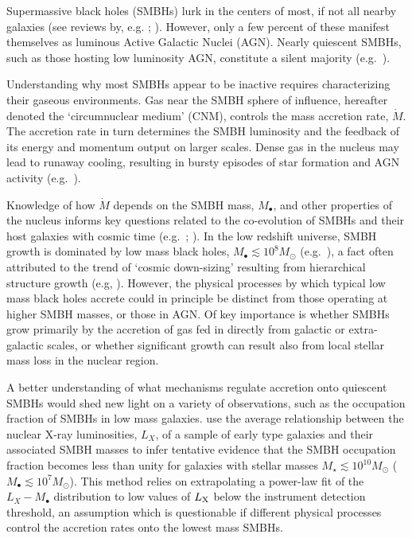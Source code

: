 \documentclass[usenatbib,fleqn]{mn2e}
\newcommand{\Mbh}[1][]{M_{\bullet#1}}
\begin{document}
Supermassive black holes (SMBHs) lurk in the centers of most, if not
all nearby galaxies (see reviews by,
e.g. \citealt{KormendyRichstone:1995a};
\citealt{FerrareseFord:2005a}). However, only a few percent of these
manifest themselves as luminous Active Galactic Nuclei (AGN).  Nearly
quiescent SMBHs, such as those hosting low luminosity AGN, constitute
a silent majority (e.g.~\citealt{Ho:2009a}).

Understanding why most SMBHs appear to be inactive requires
characterizing their gaseous environments.  Gas near the SMBH sphere
of influence, hereafter denoted the `circumnuclear medium' (CNM),
controls the mass accretion rate, $\dot{M}$.  The accretion rate in
turn determines the SMBH luminosity and the feedback of its energy and
momentum output on larger scales.  Dense gas in the nucleus may lead to runaway cooling, resulting in bursty episodes of
star formation and AGN activity (e.g.~\citealt{Ciotti&Ostriker07}).

Knowledge of how $\dot{M}$ depends on the SMBH mass, $\Mbh$, and other
properties of the nucleus informs key questions related to the
co-evolution of SMBHs and their host galaxies with cosmic time
(e.g.~\citealt{Kormendy&Ho13}; \citealt{HeckmanBest:2014a}).  In the
low redshift universe, SMBH growth is dominated by low mass black
holes, $M_{\bullet} \lesssim 10^{8}M_{\odot}$
(e.g.~\citealt{Heckman+04}), a fact often attributed to the trend of
`cosmic down-sizing' resulting from hierarchical structure growth
(e.g, \citealt{Gallo+08}).  However, the physical processes by which typical
low mass black holes accrete could in principle be distinct from those
operating at higher SMBH masses, or those in AGN.  Of key importance is whether SMBHs grow primarily by the
accretion of gas fed in directly from galactic or extra-galactic
scales, or whether significant growth can result also from local
stellar mass loss in the nuclear region.

A better understanding of what mechanisms regulate accretion onto
quiescent SMBHs would shed new light on a variety of observations,
such as the occupation fraction of SMBHs in low mass galaxies.
\citet{Miller+15} use the average relationship between the nuclear
X-ray luminosities, $L_{X}$, of a sample of early type galaxies and
their associated SMBH masses to infer tentative evidence that the SMBH
occupation fraction becomes less than unity for galaxies with stellar
masses $M_{\star} \lesssim 10^{10}M_{\odot}$ ($M_{\bullet} \lesssim
10^{7}M_{\odot}$).  This method relies on extrapolating a power-law
fit of the $L_X-\Mbh$ distribution to low values of $L_{\rm X}$ below
the instrument detection threshold, an assumption which is
questionable if different physical processes control the accretion
rates onto the lowest mass SMBHs.
\end{document}
